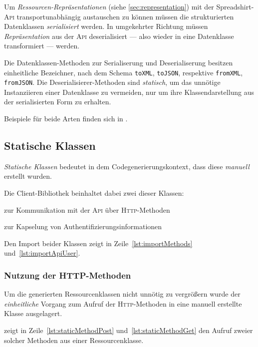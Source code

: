 Um \emph{Ressourcen-Repräsentationen} (siehe \cref{sec:representation}) mit der Spreadshirt-\textsc{Api} transportunabhängig austauschen zu können müssen die strukturierten Datenklassen \emph{serialisiert} werden. In umgekehrter Richtung müssen \emph{Repräsentation} aus der \textsc{Api} deserialisiert --- also wieder in eine Datenklasse transformiert --- werden.

Die Datenklassen-Methoden zur Serialiserung und Deserialiserung besitzen einheitliche Bezeichner, nach dem Schema \texttt{toXML}, \texttt{toJSON}, respektive \texttt{fromXML}, \texttt{fromJSON}. Die Deserialisierer-Methoden sind \emph{statisch}, um das unnötige Instanziieren einer Datenklasse zu vermeiden, nur um ihre Klassendarstellung aus der serialisierten Form zu erhalten.

Beispiele für beide Arten finden sich in .

\subsection{Statische Klassen}
\label{sec:static_classes}

\emph{Statische Klassen} bedeutet in dem Codegenerierungskontext, dass diese \emph{manuell} erstellt wurden. 

Die Client-Bibliothek beinhaltet dabei zwei dieser Klassen:
\begin{compactenum}
    \item zur Kommunikation mit der \textsc{Api} über \textsc{Http}-Methoden
    \item zur Kapselung von Authentifizierungsinformationen
\end{compactenum}

Den Import beider Klassen zeigt  in Zeile~\ref{lst:importMethods} und~\ref{lst:importApiUser}.

\subsubsection{Nutzung der HTTP-Methoden}
\label{sec:staticMethodsClass}

Um die generierten Ressourcenklassen nicht unnötig zu vergrößern wurde der \emph{einheitliche} Vorgang zum Aufruf der \textsc{Http}-Methoden in eine manuell erstellte Klasse ausgelagert.

 zeigt in Zeile~\ref{lst:staticMethodPost} und~\ref{lst:staticMethodGet} den Aufruf zweier solcher Methoden aus einer Ressourcenklasse.

